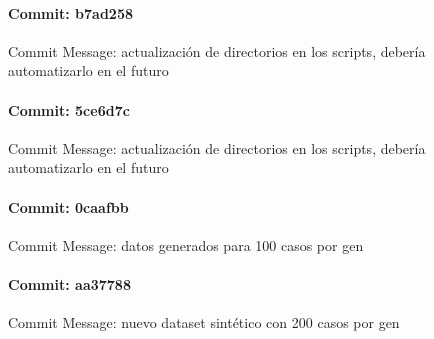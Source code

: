\documentclass{article}
\begin{document}
\paragraph{Commit: b7ad258}
Commit Message: actualización de directorios en los scripts, debería automatizarlo en el futuro

\paragraph{Commit: 5ce6d7c}
Commit Message: actualización de directorios en los scripts, debería automatizarlo en el futuro

\paragraph{Commit: 0caafbb}
Commit Message: datos generados para 100 casos por gen

\paragraph{Commit: aa37788}
Commit Message: nuevo dataset sintético con 200 casos por gen

\end{document}

